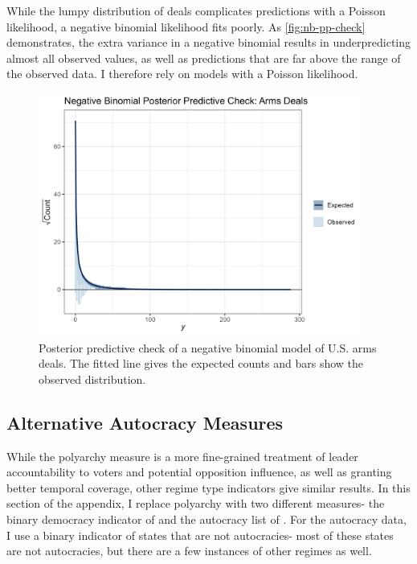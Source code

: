 \documentclass[12pt]{article}
\begin{document}
While the lumpy distribution of deals complicates predictions with a Poisson likelihood, a negative binomial likelihood fits poorly. 
As \autoref{fig:nb-pp-check} demonstrates, the extra variance in a negative binomial results in underpredicting almost all observed values, as well as predictions that are far above the range of the observed data. 
I therefore rely on models with a Poisson likelihood. 


\begin{figure}[htpb]
	\centering
		\includegraphics[width=0.95\textwidth]{nb-pp-check.png}
	\caption{Posterior predictive check of a negative binomial model of U.S. arms deals. The fitted line gives the expected counts and bars show the observed distribution.}
	\label{fig:nb-pp-check}
\end{figure}



\subsection{Alternative Autocracy Measures}

While the polyarchy measure is a more fine-grained treatment of leader accountability to voters and potential opposition influence, as well as granting better temporal coverage, other regime type indicators give similar results.
In this section of the appendix, I replace polyarchy with two different measures- the binary democracy indicator of \citet{CGV2010} and the autocracy list of \citet{Geddes2014}.
For the autocracy data, I use a binary indicator of states that are not autocracies- most of these states are not autocracies, but there are a few instances of other regimes as well. 
\end{document}
